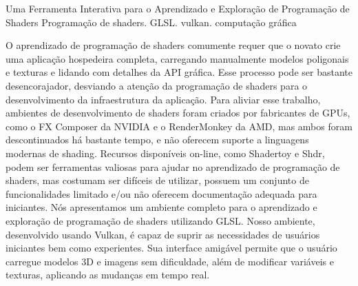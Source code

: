 
\begin{englishabstract}
{ Uma Ferramenta Interativa para o Aprendizado e Exploração de Programação de Shaders }
{ Programação de shaders. GLSL. vulkan. computação gráfica }

    O aprendizado de programação de shaders comumente requer que o novato crie uma aplicação hospedeira completa, carregando manualmente modelos poligonais e texturas e lidando com detalhes da API gráfica. Esse processo pode ser bastante desencorajador, desviando a atenção da programação de shaders para o desenvolvimento da infraestrutura da aplicação. Para aliviar esse trabalho, ambientes de desenvolvimento de shaders foram criados por fabricantes de GPUs, como o FX Composer da NVIDIA e o RenderMonkey da AMD, mas ambos foram descontinuados há bastante tempo, e não oferecem suporte a linguagens modernas de shading. Recursos disponíveis on-line, como Shadertoy e Shdr, podem ser ferramentas valiosas para ajudar no aprendizado de programação de shaders, mas costumam ser difíceis de utilizar, possuem um conjunto de funcionalidades limitado e/ou não oferecem documentação adequada para iniciantes. Nós apresentamos um ambiente completo para o aprendizado e exploração de programação de shaders utilizando GLSL. Nosso ambiente, desenvolvido usando Vulkan, é capaz de suprir as necessidades de usuários iniciantes bem como experientes. Sua interface amigável permite que o usuário carregue modelos 3D e imagens sem dificuldade, além de modificar variáveis e texturas, aplicando as mudanças em tempo real.

\end{englishabstract}
